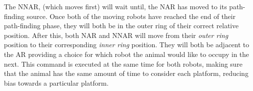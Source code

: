 The NNAR, (which moves first) will wait until, the NAR has moved to its path-finding source. Once both of the moving robots have reached the end of their path-finding phase, they will both be in the outer ring of their correct relative position.  After this, both NAR and NNAR will move from their \textit{outer ring} position to their corresponding \textit{inner ring} position. They will both be adjacent to the AR providing a choice for which robot the animal would like to occupy in the next. This command is executed at the same time for both robots, making sure that the animal has the same amount of time to consider each platform, reducing bias towards a particular platform.







